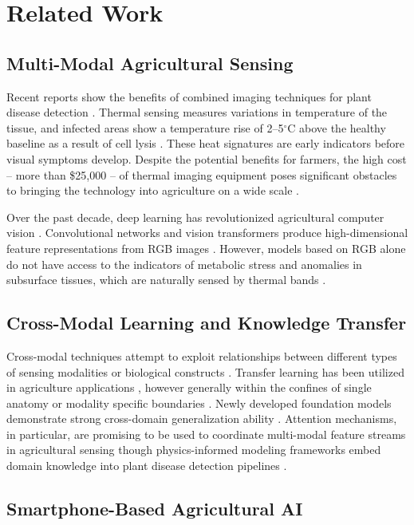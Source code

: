 \documentclass[conference]{IEEEtran}
\begin{document}
\section{Related Work}

\subsection{Multi-Modal Agricultural Sensing}
Recent reports show the benefits of combined imaging techniques for plant disease detection \cite{maimaitijiang2020}. Thermal sensing measures variations in temperature of the tissue, and infected areas show a temperature rise of 2--5$^\circ$C above the healthy baseline as a result of cell lysis \cite{mahlein2016}. These heat signatures are early indicators before visual symptoms develop. Despite the potential benefits for farmers, the high cost -- more than \$25,000 -- of thermal imaging equipment poses significant obstacles to bringing the technology into agriculture on a wide scale \cite{sishodia2020}. 

Over the past decade, deep learning has revolutionized agricultural computer vision \cite{kamilaris2018}. Convolutional networks and vision transformers produce high-dimensional feature representations from RGB images \cite{dosovitskiy2021}. However, models based on RGB alone do not have access to the indicators of metabolic stress and anomalies in subsurface tissues, which are naturally sensed by thermal bands \cite{lu2020}. 
\subsection{Cross-Modal Learning and Knowledge Transfer}

Cross-modal techniques attempt to exploit relationships between different types of sensing modalities or biological constructs \cite{zhuang2020}. Transfer learning has been utilized in agriculture applications \cite{chen2020_transfer,tan2018}, however generally within the confines of single anatomy or modality specific boundaries \cite{barbedo2019}.
Newly developed foundation models demonstrate strong cross-domain generalization ability \cite{vaswani2017}. Attention mechanisms, in particular, are promising to be used to coordinate multi-modal feature streams in agricultural sensing \cite{niu2021} though physics-informed modeling frameworks embed domain knowledge into plant disease detection pipelines \cite{karniadakis2021}. 

\subsection{Smartphone-Based Agricultural AI}
\end{document}
